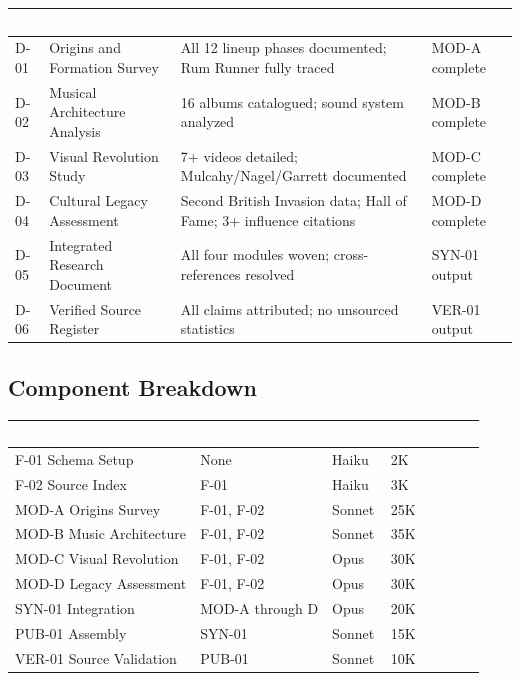 \documentclass[11pt,letterpaper]{article}
\newcommand{\tableheader}[1]{\textbf{\sffamily\textcolor{white}{#1}}}
\begin{document}
\begin{center}
\begin{tabularx}{\textwidth}{C{0.8cm}L{4cm}XL{3cm}}
\toprule
{}
\tableheader{\#} & \tableheader{Deliverable} & \tableheader{Acceptance Criteria} & \tableheader{Spec} \\
\midrule
D-01 & Origins and Formation Survey & All 12 lineup phases documented; Rum Runner fully traced & MOD-A complete \\
D-02 & Musical Architecture Analysis & 16 albums catalogued; sound system analyzed & MOD-B complete \\
D-03 & Visual Revolution Study & 7+ videos detailed; Mulcahy/Nagel/Garrett documented & MOD-C complete \\
D-04 & Cultural Legacy Assessment & Second British Invasion data; Hall of Fame; 3+ influence citations & MOD-D complete \\
D-05 & Integrated Research Document & All four modules woven; cross-references resolved & SYN-01 output \\
D-06 & Verified Source Register & All claims attributed; no unsourced statistics & VER-01 output \\
\bottomrule
\end{tabularx}
\end{center}

\subsection{Component Breakdown}

\begin{center}
\begin{tabularx}{\textwidth}{L{3cm}L{3cm}C{2cm}C{2cm}}
\toprule
{}
\tableheader{Component} & \tableheader{Dependencies} & \tableheader{Model} & \tableheader{Est. Tokens} \\
\midrule
F-01 Schema Setup & None & Haiku & 2K \\
F-02 Source Index & F-01 & Haiku & 3K \\
MOD-A Origins Survey & F-01, F-02 & Sonnet & 25K \\
MOD-B Music Architecture & F-01, F-02 & Sonnet & 35K \\
MOD-C Visual Revolution & F-01, F-02 & Opus & 30K \\
MOD-D Legacy Assessment & F-01, F-02 & Opus & 30K \\
SYN-01 Integration & MOD-A through D & Opus & 20K \\
PUB-01 Assembly & SYN-01 & Sonnet & 15K \\
VER-01 Source Validation & PUB-01 & Sonnet & 10K \\
\bottomrule
\end{tabularx}
\end{center}
\end{document}
